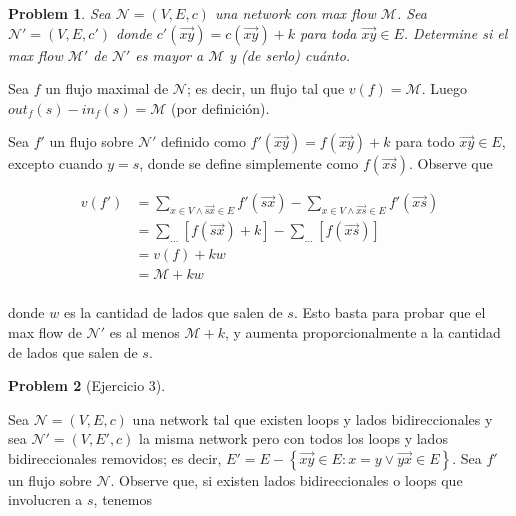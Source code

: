\documentclass[a4paper]{article}
\newtheorem{problem}{Problem}
\newtheorem{problem}{Problem}
\begin{document}
\begin{problem}
    Sea $\mathcal{N} = (V, E, c)$ una network con max flow $\mathcal{M}$. Sea
    $\mathcal{N}' = (V, E, c')$ donde $c'(\overrightarrow{xy}) =
    c(\overrightarrow{xy}) + k$ para toda $\overrightarrow{xy} \in E$. Determine
    si el max flow $\mathcal{M}'$ de $\mathcal{N}'$ es mayor a $\mathcal{M}$ y
    (de serlo) cuánto.
\end{problem}

Sea $f$ un flujo maximal de $\mathcal{N}$; es decir, un flujo tal que $v(f) =
\mathcal{M}$. Luego $out_f(s) - in_f(s) = \mathcal{M}$ (por definición).

Sea $f'$ un flujo sobre $\mathcal{N}'$ definido como $f'(\overrightarrow{xy}) =
f(\overrightarrow{xy}) + k$ para todo $\overrightarrow{xy} \in E$, excepto
cuando $y = s$, donde se define simplemente como $f(\overrightarrow{xs})$. Observe que

\begin{align*}
    v(f') &= \sum_{x \in V \land \overrightarrow{sx} \in E}
    f'(\overrightarrow{sx}) - \sum_{x \in V \land  \overrightarrow{xs} \in E}
    f'(\overrightarrow{xs}) \\ 
    &= \sum_{\ldots} \left[ f(\overrightarrow{sx}) + k \right]  - \sum_{\ldots}
    \left[ f(\overrightarrow{xs})\right]  \\ 
    &= v(f) + kw  \\ 
    &= \mathcal{M} + kw \\ 
\end{align*}

donde $w$ es la cantidad de lados que salen de $s$. 
Esto basta para probar que el max flow de $\mathcal{N}'$ es al menos
$\mathcal{M} + k$, y aumenta proporcionalmente a la cantidad de lados que salen
de $s$.

\begin{problem}[Ejercicio 3]

    
\end{problem}

    Sea $\mathcal{N} = (V, E, c)$ una network tal que existen loops y lados
    bidireccionales y sea $\mathcal{N}' = (V, E', c)$ la misma network pero con todos los
    loops y lados bidireccionales removidos; es decir, $E' = E - \left\{
    \overrightarrow{xy} \in E : x = y \lor \overrightarrow{yx} \in E \right\} $.
    Sea $f'$ un flujo sobre $\mathcal{N}$. Observe que, si existen lados
    bidireccionales o loops que involucren a $s$, tenemos 
\end{document}
